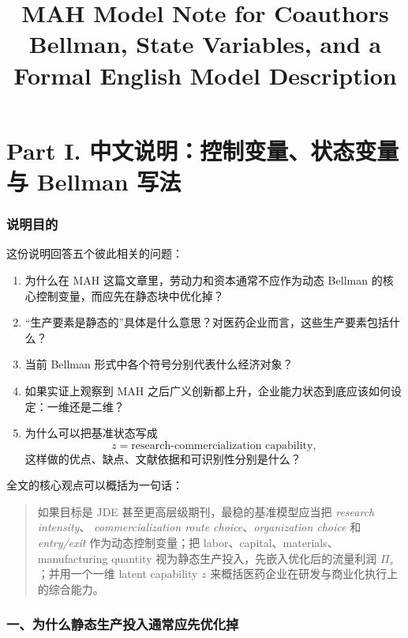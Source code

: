 \documentclass[12pt]{ctexart}
\title{MAH Model Note for Coauthors\\
Bellman, State Variables, and a Formal English Model Description}
\author{}
\date{}
\begin{document}
\maketitle
\tableofcontents
\newpage

\part*{Part I. 中文说明：控制变量、状态变量与 Bellman 写法}


\section{说明目的}

这份说明回答五个彼此相关的问题：

\begin{enumerate}[leftmargin=2em]
    \item 为什么在 MAH 这篇文章里，劳动力和资本通常不应作为动态 Bellman 的核心控制变量，而应先在静态块中优化掉？
    \item “生产要素是静态的”具体是什么意思？对医药企业而言，这些生产要素包括什么？
    \item 当前 Bellman 形式中各个符号分别代表什么经济对象？
    \item 如果实证上观察到 MAH 之后广义创新都上升，企业能力状态到底应该如何设定：一维还是二维？
    \item 为什么可以把基准状态写成
    \[
    z=\text{research-commercialization capability},
    \]
    这样做的优点、缺点、文献依据和可识别性分别是什么？
\end{enumerate}

全文的核心观点可以概括为一句话：

\begin{quote}
如果目标是 JDE 甚至更高层级期刊，最稳的基准模型应当把 \emph{research intensity}、
\emph{commercialization route choice}、\emph{organization choice} 和
\emph{entry/exit} 作为动态控制变量；把 labor、capital、materials、
manufacturing quantity 视为静态生产投入，先嵌入优化后的流量利润
\(\Pi_s\)；并用一个一维 latent capability \(z\) 来概括医药企业在研发与商业化执行上的综合能力。
\end{quote}

\section{一、为什么静态生产投入通常应先优化掉}
\end{document}

